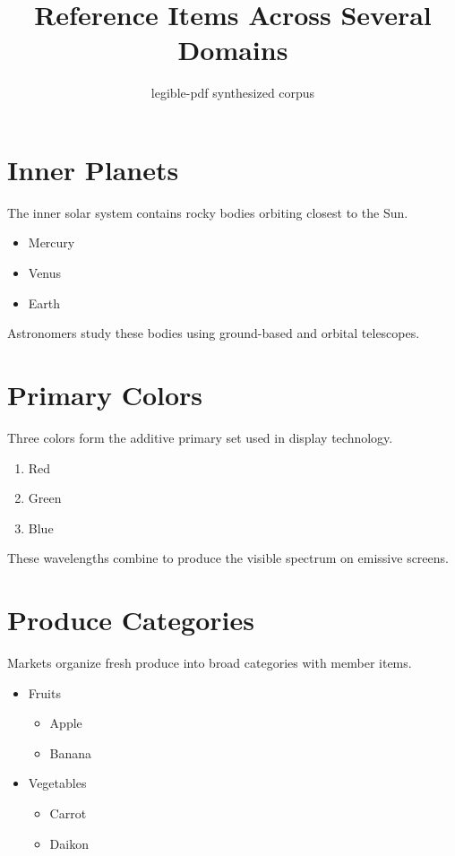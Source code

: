 \documentclass[12pt]{article}
\title{Reference Items Across Several Domains}
\author{legible-pdf synthesized corpus}
\date{}
\begin{document}
\maketitle

\section{Inner Planets}

The inner solar system contains rocky bodies orbiting closest to the Sun.

\begin{itemize}
\item Mercury
\item Venus
\item Earth
\end{itemize}

Astronomers study these bodies using ground-based and orbital telescopes.

\section{Primary Colors}

Three colors form the additive primary set used in display technology.

\begin{enumerate}
\item Red
\item Green
\item Blue
\end{enumerate}

These wavelengths combine to produce the visible spectrum on emissive screens.

\section{Produce Categories}

Markets organize fresh produce into broad categories with member items.

\begin{itemize}
\item Fruits
  \begin{itemize}
  \item Apple
  \item Banana
  \end{itemize}
\item Vegetables
  \begin{itemize}
  \item Carrot
  \item Daikon
  \end{itemize}
\end{itemize}
\end{document}
